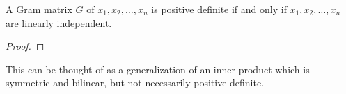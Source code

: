 \begin{theorem}
    \label{thm:gram-pd-iff-lin-indep}
    \cite{horn2013matrix}
    A Gram matrix \(G\) of \(x_1, x_2, \dots, x_n\) is positive definite if and only if \(x_1, x_2, \dots, x_n\) are linearly independent.
\end{theorem}
\begin{proof}
    
\end{proof}

\begin{definition}
    \label{def:symmetric-bilinear-form}
    
\end{definition}

This can be thought of as a generalization of an inner product which is symmetric and bilinear, but not necessarily positive definite.

\begin{example}
    \label{eg:symmetric-bilinear-form}
    
\end{example}